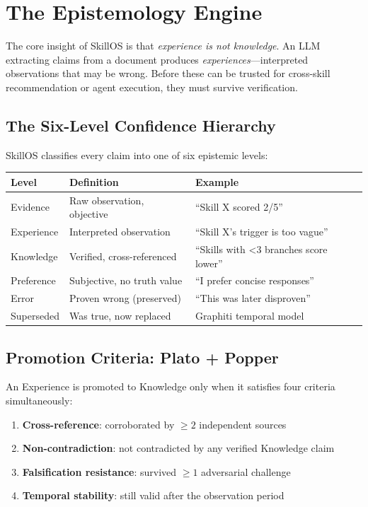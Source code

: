 \documentclass[11pt]{article}
\begin{document}
\section{The Epistemology Engine}
\label{sec:epistemology}

The core insight of SkillOS is that \textit{experience is not knowledge}. An LLM extracting claims from a document produces \textit{experiences}---interpreted observations that may be wrong. Before these can be trusted for cross-skill recommendation or agent execution, they must survive verification.

\subsection{The Six-Level Confidence Hierarchy}

SkillOS classifies every claim into one of six epistemic levels:

\begin{center}
\begin{tabular}{lll}
\toprule
\textbf{Level} & \textbf{Definition} & \textbf{Example} \\
\midrule
Evidence   & Raw observation, objective & ``Skill X scored 2/5'' \\
Experience & Interpreted observation   & ``Skill X's trigger is too vague'' \\
Knowledge  & Verified, cross-referenced & ``Skills with <3 branches score lower'' \\
Preference & Subjective, no truth value & ``I prefer concise responses'' \\
Error      & Proven wrong (preserved)   & ``This was later disproven'' \\
Superseded & Was true, now replaced     & Graphiti temporal model \\
\bottomrule
\end{tabular}
\end{center}

\subsection{Promotion Criteria: Plato + Popper}

An Experience is promoted to Knowledge only when it satisfies four criteria simultaneously:

\begin{enumerate}[leftmargin=*,nosep]
    \item \textbf{Cross-reference}: corroborated by $\geq 2$ independent sources
    \item \textbf{Non-contradiction}: not contradicted by any verified Knowledge claim
    \item \textbf{Falsification resistance}: survived $\geq 1$ adversarial challenge
    \item \textbf{Temporal stability}: still valid after the observation period
\end{enumerate}
\end{document}

